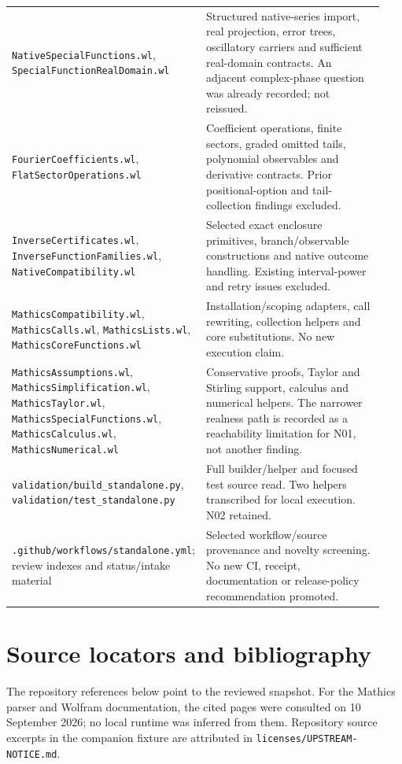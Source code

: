 \documentclass[11pt,letterpaper]{article}
\newcommand{\code}[1]{\nolinkurl{#1}}
\begin{document}
{\begin{longtable}{@{}p{0.36\linewidth}p{0.58\linewidth}@{}}
\code{NativeSpecialFunctions.wl}, \code{SpecialFunctionRealDomain.wl} & Structured native-series import, real projection, error trees, oscillatory carriers and sufficient real-domain contracts. An adjacent complex-phase question was already recorded; not reissued.\\
\code{FourierCoefficients.wl}, \code{FlatSectorOperations.wl} & Coefficient operations, finite sectors, graded omitted tails, polynomial observables and derivative contracts. Prior positional-option and tail-collection findings excluded.\\
\code{InverseCertificates.wl}, \code{InverseFunctionFamilies.wl}, \code{NativeCompatibility.wl} & Selected exact enclosure primitives, branch/observable constructions and native outcome handling. Existing interval-power and retry issues excluded.\\
\code{MathicsCompatibility.wl}, \code{MathicsCalls.wl}, \code{MathicsLists.wl}, \code{MathicsCoreFunctions.wl} & Installation/scoping adapters, call rewriting, collection helpers and core substitutions. No new execution claim.\\
\code{MathicsAssumptions.wl}, \code{MathicsSimplification.wl}, \code{MathicsTaylor.wl}, \code{MathicsSpecialFunctions.wl}, \code{MathicsCalculus.wl}, \code{MathicsNumerical.wl} & Conservative proofs, Taylor and Stirling support, calculus and numerical helpers. The narrower realness path is recorded as a reachability limitation for N01, not another finding.\\
\code{validation/build_standalone.py}, \code{validation/test_standalone.py} & Full builder/helper and focused test source read. Two helpers transcribed for local execution. N02 retained.\\
\code{.github/workflows/standalone.yml}; review indexes and status/intake material & Selected workflow/source provenance and novelty screening. No new CI, receipt, documentation or release-policy recommendation promoted.\\
\end{longtable}}

\section{Source locators and bibliography}
The repository references below point to the reviewed snapshot. For the Mathics parser and Wolfram documentation, the cited pages were consulted on 10 September 2026; no local runtime was inferred from them. Repository source excerpts in the companion fixture are attributed in \code{licenses/UPSTREAM-NOTICE.md}.
\end{document}
